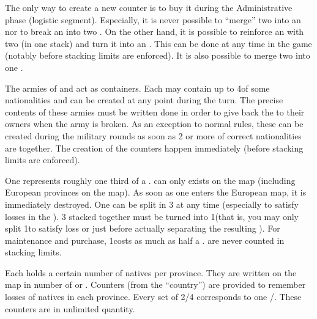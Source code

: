  The only way to create a new \ARMY
counter is to buy it during the Administrative phase (logistic segment).
\bparag Especially, it is never possible to ``merge'' two \LD into an
\ARMY\facemoins nor to break an \ARMY\faceplus into two \ARMY\facemoins.
\bparag On the other hand, it is possible to reinforce an \ARMY\facemoins with
two \LD (in one stack) and turn it into an \ARMY\faceplus. This can be done at
any time in the game (notably before stacking limits are enforced).
\bparag It is also possible to merge two \ARMY\facemoins into one
\ARMY\faceplus.

 The armies of  and 
act as containers. Each may contain up to 4\LD of some nationalities and can
be created at any point during the turn. The precise contents of these armies
must be written done in order to give back the \LD to their owners when the
army is broken.
\bparag As an exception to normal rules, these \ARMY can be created during the
military rounds as soon as 2 or more \LD of correct nationalities are
together. The creation of the \ARMY counters happen immediately (before
stacking limits are enforced).

 One \LDE represents roughly one third of
a \LD.
\bparag \LDE can only exists on the \ROTW map (including European provinces on
the \ROTW map). As soon as one \LDE enters the European map, it is immediately
destroyed.
\bparag One \LD can be split in 3 \LDE at any time (especially to satisfy
losses in the \ROTW). 3 \LDE stacked together must be turned into 1\LD (that
is, you may only split 1\LD to satisfy loss or just before actually separating
the resulting \LDE).
\bparag For maintenance and purchase, 1\LDE costs as much as half a \LD.
\bparag \LDE are never counted in stacking limits.

\aparag[Natives.] Each \ROTW \Area holds a certain number of natives per
province. They are written on the \ROTW map in number of \LD or \LDE.
\bparag Counters (from the  ``country'') are provided to
remember losses of natives in each province. Every set of 2/4 \LD corresponds
to one \ARMY\facemoins/\faceplus. These counters are in unlimited quantity.


